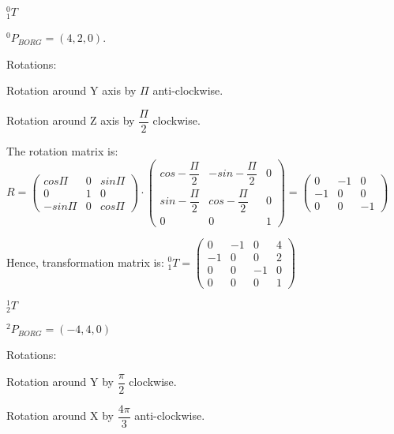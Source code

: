 \documentclass[12pt]{article}
\begin{document}
\begin{list}{)~}{}
\item
$_{1}^{0}T$

$^0 P_{BORG} = \left(4, 2, 0\right)$.

Rotations:

\begin{list}{)~}{}
\item Rotation around Y axis by $\Pi$ anti-clockwise.
\item Rotation around Z axis by $\dfrac{\Pi}{2}$ clockwise.
\end{list}

The rotation matrix is:
$R=\left(\begin{array}{ccc}
cos \Pi & 0 & sin \Pi \\
0 & 1 & 0 \\
-sin \Pi & 0 & cos \Pi \end{array}\right) \cdot 
\left(\begin{array}{ccc}
cos - \dfrac{\Pi}{2} & -sin - \dfrac{\Pi}{2} & 0 \\
sin - \dfrac{\Pi}{2} & cos - \dfrac{\Pi}{2} & 0 \\
0 & 0 & 1\end{array}\right) = 
\left(\begin{array}{ccc}
0 & -1 & 0 \\
-1 & 0 & 0 \\
0 & 0 & -1\end{array}\right)$

Hence, transformation matrix is:
$_{1}^{0}T = \left(\begin{array}{cccc}
0 & -1 & 0 & 4 \\
-1 & 0 & 0 & 2\\
0 & 0 & -1 & 0\\
0 & 0 & 0 & 1\end{array}\right)$

\item
$_{2}^1T$

$^2 P_{BORG} = \left(-4, 4, 0\right)$

Rotations:
\begin{list}{)~}{}
\item Rotation around Y by $\dfrac{\pi}{2}$ clockwise.
\item Rotation around X by $\dfrac{4 \pi}{3}$ anti-clockwise.
\end{list}


\end{list}
\end{document}
